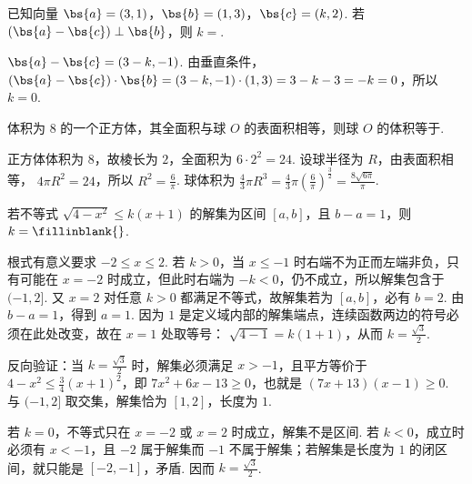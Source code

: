 \begin{problem}
已知向量 \( \bs{a} = (3, 1) \)，\( \bs{b} = (1, 3) \)，\( \bs{c} = (k, 2) \). 若 \( (\bs{a} - \bs{c}) \perp \bs{b} \)，则 \(k =\)\fillinblank{}.
\begin{solution}
\(\bs{a}-\bs{c}=(3-k,-1)\). 由垂直条件，
\((\bs{a}-\bs{c})\cdot\bs{b}=(3-k,-1)\cdot(1,3)=3-k-3=-k=0\)，所以 \(k=0\).
\end{solution}
\end{problem}

\begin{problem}
体积为 \(8\) 的一个正方体，其全面积与球 \(O\) 的表面积相等，则球 \(O\) 的体积等于\fillinblank{}.
\answer{\(\dfrac{8\sqrt{6\pi}}{\pi}\)}
\begin{solution}
正方体体积为 \(8\)，故棱长为 \(2\)，全面积为 \(6\cdot2^{2}=24\). 设球半径为 \(R\)，由表面积相等，
\(4\pi R^{2}=24\)，所以 \(R^{2}=\frac{6}{\pi}\). 球体积为
\(\frac43\pi R^{3}=\frac43\pi\left(\frac6\pi\right)^{\frac{3}{2}}=\frac{8\sqrt{6\pi}}{\pi}\).
\end{solution}
\end{problem}

\begin{problem}
若不等式 \( \sqrt{4-x^{2}} \leqslant k(x+1) \) 的解集为区间 \([a,b]\)，且 \(b-a = 1\)，则 \(k =\fillinblank{}\).
\begin{solution}
根式有意义要求 \(-2\leqslant x\leqslant2\). 若 \(k>0\)，当 \(x\leqslant-1\) 时右端不为正而左端非负，只有可能在 \(x=-2\) 时成立，但此时右端为 \(-k<0\)，仍不成立，所以解集包含于 \((-1,2]\). 又 \(x=2\) 对任意 \(k>0\) 都满足不等式，故解集若为 \([a,b]\)，必有 \(b=2\). 由 \(b-a=1\)，得到 \(a=1\). 因为 \(1\) 是定义域内部的解集端点，连续函数两边的符号必须在此处改变，故在 \(x=1\) 处取等号：
\(\sqrt{4-1}=k(1+1)\)，从而 \(k=\frac{\sqrt{3}}{2}\).

反向验证：当 \(k=\frac{\sqrt{3}}{2}\) 时，解集必须满足 \(x>-1\)，且平方等价于
\(4-x^{2}\leqslant\frac34(x+1)^{2}\)，即 \(7x^{2}+6x-13\geqslant0\)，也就是 \((7x+13)(x-1)\geqslant0\). 与 \((-1,2]\) 取交集，解集恰为 \([1,2]\)，长度为 \(1\).

若 \(k=0\)，不等式只在 \(x=-2\) 或 \(x=2\) 时成立，解集不是区间. 若 \(k<0\)，成立时必须有 \(x<-1\)，且 \(-2\) 属于解集而 \(-1\) 不属于解集；若解集是长度为 \(1\) 的闭区间，就只能是 \([-2,-1]\)，矛盾. 因而 \(k=\frac{\sqrt{3}}{2}\).
\end{solution}
\end{problem}


